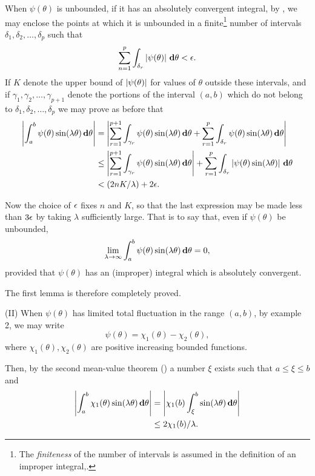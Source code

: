 When $\psi(\theta)$ is unbounded, if it has an absolutely convergent integral,
by , we may enclose the points at which it is unbounded in a
finite\footnote{The \emph{finiteness} of the number of intervals is assumed in the
definition of an improper integral,.} number
%
%
of intervals $\delta_{1}, \delta_{2}, \ldots, \delta_{p}$ such that
$$
\sum_{n=1}^{p}
\int_{\delta_{r}}
\left|  \psi(\theta)  \right| \, \mathbf{d} \theta
<
\epsilon.
$$
If $K$ denote the upper bound of $\left| \psi(\theta) \right|$ for values of
$\theta$ outside these intervals, and if
$\gamma_{1}, \gamma_{2}, \ldots, \gamma_{p+1}$ denote the portions of the interval
$(a, b)$ which do not belong to $\delta_{1}, \delta_{2}, \ldots, \delta_{p}$
we may prove as before that
\begin{align*}
  \left| \int_{a}^{b} \psi(\theta) \sin (\lambda \theta) \, \mathbf{d} \theta \right|
  & =
  \left| 
    \sum_{r=1}^{p+1}
    \int_{\gamma_{r}} \psi(\theta) \sin(\lambda \theta) \, \mathbf{d} \theta
    +
    \sum_{r=1}^{p}
    \int_{\delta_{r}} \psi(\theta) \sin(\lambda \theta) \, \mathbf{d} \theta
   \right|
  \\
  & \leq
  \left| 
    \sum_{r=1}^{p+1}
    \int_{\gamma_{r}} \psi(\theta) \sin(\lambda \theta) \, \mathbf{d} \theta
   \right|
  +
  \sum_{r=1}^{p}
  \int_{\delta_{r}}
  \left| \psi(\theta) \sin(\lambda \theta) \right|
  \, \mathbf{d} \theta
  \\
  & <
  (2nK / \lambda) + 2 \epsilon.
\end{align*}

Now the choice of $\epsilon$ fixes $n$ and $K$, so that the last expression may be
made less than $3\epsilon$ by taking $\lambda$ sufficiently large. That is to say
that, even if $\psi(\theta)$ be unbounded,
$$
\lim_{\lambda \rightarrow \infty}
\int_{a}^{b} \psi(\theta) \sin(\lambda \theta) \, \mathbf{d} \theta
=
0,
$$
provided that $\psi(\theta)$ has an (improper) integral which is absolutely
convergent.

The first lemma is therefore completely proved.

(II) When $\psi(\theta)$ has limited total fluctuation in the range $(a, b)$,
by %
 example 2, we may write
$$
\psi(\theta) = \chi_{1}(\theta) - \chi_{2}(\theta),
$$
where $\chi_{1}(\theta), \chi_{2}(\theta)$ are positive increasing bounded functions.

Then, by the second mean-value theorem () a number
$\xi$ exists such that $a \leq \xi \leq b$ and
\begin{align*}
  \left| 
    \int_{a}^{b} \chi_{1}(\theta) \sin(\lambda \theta) \, \mathbf{d} \theta
   \right|
  &=
  \left| 
    \chi_{1}(b) \int_{\xi}^{b} \sin(\lambda \theta) \, \mathbf{d} \theta
   \right|
  \\
  & \leq
  2 \chi_{1}(b) / \lambda.
\end{align*}

